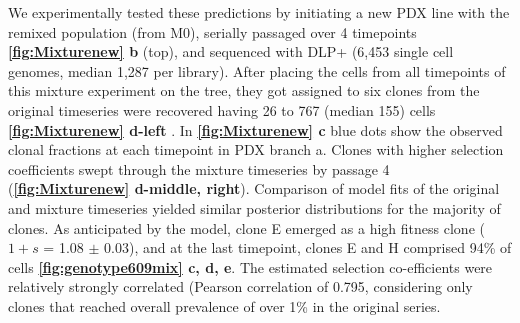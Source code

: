 
We experimentally tested these predictions by initiating a new PDX line with the remixed population (from M0), serially passaged over 4 timepoints \textbf{\autoref{fig:Mixturenew} b} (top), and sequenced with DLP+ (6,453 single cell genomes, median 1,287 per library). After placing the cells from all timepoints of this mixture experiment on the tree, they got assigned to six clones from the original timeseries were recovered having 26 to 767 (median 155) cells \textbf{\autoref{fig:Mixturenew} d-left} . In \textbf{\autoref{fig:Mixturenew} c} blue dots show the observed clonal fractions at each timepoint in PDX branch a. Clones with higher selection coefficients swept through the mixture timeseries by passage 4 (\textbf{\autoref{fig:Mixturenew} d-middle, right}). Comparison of model fits of the original and mixture timeseries yielded similar posterior distributions for the majority of clones. As anticipated by the model, clone E emerged as a high fitness clone ($1+s$ = 1.08  $\pm$ 0.03), and at the last timepoint, clones E and H comprised 94\% of cells \textbf{\autoref{fig:genotype609mix} c, d, e}. 
The estimated selection co-efficients were relatively strongly correlated (Pearson correlation of 0.795, considering only clones that reached overall prevalence of over 1\% in the original series.

